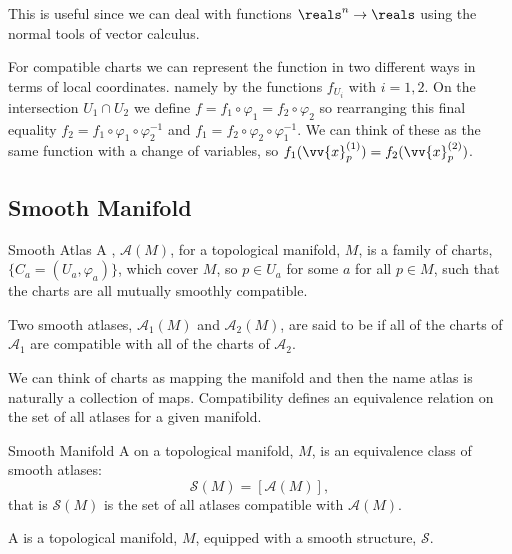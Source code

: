 This is useful since we can deal with functions \(\reals^n \to \reals\) using the normal tools of vector calculus.

For compatible charts we can represent the function in two different ways in terms of local coordinates.
namely by the functions \(f_{U_i}\) with \(i = 1, 2\).
On the intersection \(U_1 \cap U_2\) we define \(f = f_1 \circ \varphi_1 = f_2 \circ \varphi_2\) so rearranging this final equality \(f_2 = f_1 \circ \varphi_1 \circ \varphi_2^{-1}\) and \(f_1 = f_2 \circ \varphi_2 \circ \varphi_1^{-1}\).
We can think of these as the same function with a change of variables, so \(f_1(\vv{x}_p^{(1)}) = f_2(\vv{x}_p^{(2)})\).

\subsection{Smooth Manifold}
\begin{dfn}{Smooth Atlas}{}
    A , \(\mathcal{A}(M)\), for a topological manifold, \(M\), is a family of charts, \(\{C_a = (U_a, \varphi_a)\}\), which cover \(M\), so \(p \in U_a\) for some \(a\) for all \(p \in M\), such that the charts are all mutually smoothly compatible.
    
    Two smooth atlases, \(\mathcal{A}_1(M)\) and \(\mathcal{A}_2(M)\), are said to be  if all of the charts of \(\mathcal{A}_1\) are compatible with all of the charts of \(\mathcal{A}_2\).
\end{dfn}

We can think of charts as mapping the manifold and then the name atlas is naturally a collection of maps.
Compatibility defines an equivalence relation on the set of all atlases for a given manifold.

\begin{dfn}{Smooth Manifold}{}
    A  on a topological manifold, \(M\), is an equivalence class of smooth atlases:
    \begin{equation}
        \mathcal{S}(M) = [\mathcal{A}(M)],
    \end{equation}
    that is \(\mathcal{S}(M)\) is the set of all atlases compatible with \(\mathcal{A}(M)\).
    
    A  is a topological manifold, \(M\), equipped with a smooth structure, \(\mathcal{S}\).
\end{dfn}

